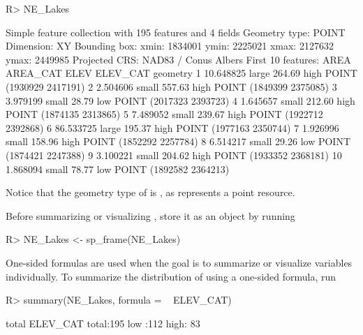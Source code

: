 \documentclass[
  shortnames]{jss}
\begin{document}
\begin{CodeChunk}
\begin{CodeInput}
R> NE_Lakes
\end{CodeInput}
\begin{CodeOutput}
Simple feature collection with 195 features and 4 fields
Geometry type: POINT
Dimension:     XY
Bounding box:  xmin: 1834001 ymin: 2225021 xmax: 2127632 ymax: 2449985
Projected CRS: NAD83 / Conus Albers
First 10 features:
        AREA AREA_CAT   ELEV ELEV_CAT                geometry
1  10.648825    large 264.69     high POINT (1930929 2417191)
2   2.504606    small 557.63     high POINT (1849399 2375085)
3   3.979199    small  28.79      low POINT (2017323 2393723)
4   1.645657    small 212.60     high POINT (1874135 2313865)
5   7.489052    small 239.67     high POINT (1922712 2392868)
6  86.533725    large 195.37     high POINT (1977163 2350744)
7   1.926996    small 158.96     high POINT (1852292 2257784)
8   6.514217    small  29.26      low POINT (1874421 2247388)
9   3.100221    small 204.62     high POINT (1933352 2368181)
10  1.868094    small  78.77      low POINT (1892582 2364213)
\end{CodeOutput}
\end{CodeChunk}

Notice that the geometry type of  is , as
 represents a point resource.

Before summarizing or visualizing , store it as an
 object by running

\begin{CodeChunk}
\begin{CodeInput}
R> NE_Lakes <- sp_frame(NE_Lakes)
\end{CodeInput}
\end{CodeChunk}

One-sided formulas are used when the goal is to summarize or visualize
variables individually. To summarize the distribution of 
using a one-sided formula, run

\begin{CodeChunk}
\begin{CodeInput}
R> summary(NE_Lakes, formula = ~ ELEV_CAT)
\end{CodeInput}
\begin{CodeOutput}
   total     ELEV_CAT  
 total:195   low :112  
             high: 83  
\end{CodeOutput}
\end{CodeChunk}
\end{document}
